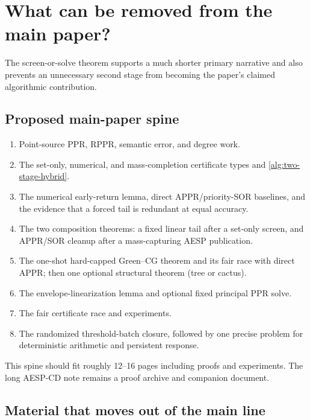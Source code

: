 \section{What can be removed from the main paper?}
\label{sec:two-stage-reduction}

The screen-or-solve theorem supports a much shorter primary narrative and
also prevents an unnecessary second stage from becoming the paper's claimed
algorithmic contribution.

\subsection{Proposed main-paper spine}

\begin{enumerate}[leftmargin=2.2em]
\item Point-source PPR, RPPR, semantic error, and degree work.
\item The set-only, numerical, and mass-completion certificate types and
  \cref{alg:two-stage-hybrid}.
\item The numerical early-return lemma, direct APPR/priority-SOR baselines,
  and the evidence that a forced tail is redundant at equal accuracy.
\item The two composition theorems: a fixed linear tail after a set-only
  screen, and APPR/SOR cleanup after a mass-capturing AESP publication.
\item The one-shot hard-capped Green--CG theorem and its fair race with
  direct APPR; then one optional structural theorem (tree or cactus).
\item The envelope-linearization lemma and optional fixed principal PPR solve.
\item The fair certificate race and experiments.
\item The randomized threshold-batch closure, followed by one precise problem
  for deterministic arithmetic and persistent response.
\end{enumerate}

This spine should fit roughly 12--16 pages including proofs and experiments.
The long AESP-CD note remains a proof archive and companion document.

\subsection{Material that moves out of the main line}

